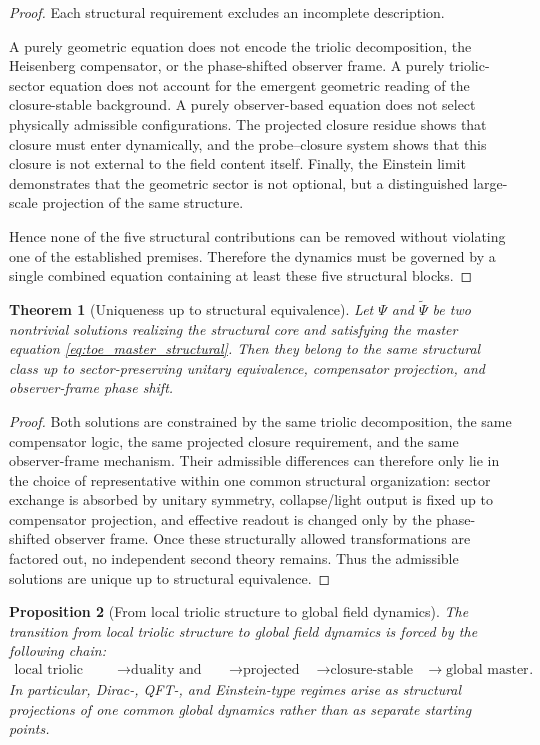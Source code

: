\documentclass[12pt,a4paper]{article}
\newtheorem{theorem}{Theorem}[section]
\newtheorem{proposition}[theorem]{Proposition}
\begin{document}
\begin{proof}
Each structural requirement excludes an incomplete description.

A purely geometric equation does not encode the triolic decomposition, the
Heisenberg compensator, or the phase-shifted observer frame. A purely
triolic-sector equation does not account for the emergent geometric reading of
the closure-stable background. A purely observer-based equation does not
select physically admissible configurations. The projected closure residue
shows that closure must enter dynamically, and the probe--closure system shows
that this closure is not external to the field content itself. Finally, the
Einstein limit demonstrates that the geometric sector is not optional, but a
distinguished large-scale projection of the same structure.

Hence none of the five structural contributions can be removed without
violating one of the established premises. Therefore the dynamics must be
governed by a single combined equation containing at least these five
structural blocks.
\end{proof}

\begin{theorem}[Uniqueness up to structural equivalence]
\label{thm:structural-uniqueness}
Let $\Psi$ and $\widetilde\Psi$ be two nontrivial solutions realizing the
structural core and satisfying the master equation
\eqref{eq:toe_master_structural}. Then they belong to the same structural
class up to sector-preserving unitary equivalence, compensator projection, and
observer-frame phase shift.
\end{theorem}

\begin{proof}
Both solutions are constrained by the same triolic decomposition, the same
compensator logic, the same projected closure requirement, and the same
observer-frame mechanism. Their admissible differences can therefore only lie
in the choice of representative within one common structural organization:
sector exchange is absorbed by unitary symmetry, collapse/light output is fixed
up to compensator projection, and effective readout is changed only by the
phase-shifted observer frame. Once these structurally allowed transformations
are factored out, no independent second theory remains. Thus the admissible
solutions are unique up to structural equivalence.
\end{proof}

\begin{proposition}[From local triolic structure to global field dynamics]
\label{prop:local-to-global}
The transition from local triolic structure to global field dynamics is forced
by the following chain:
\[
\begin{aligned}
\text{local triolic decomposition}
&\longrightarrow \text{duality and compensator action}\
&\longrightarrow \text{projected closure}\
&\longrightarrow \text{closure-stable background geometry}\
&\longrightarrow \text{global master equation}.
\end{aligned}
\]
In particular, Dirac-, QFT-, and Einstein-type regimes arise as structural
projections of one common global dynamics rather than as separate starting
points.
\end{proposition}
\end{document}
